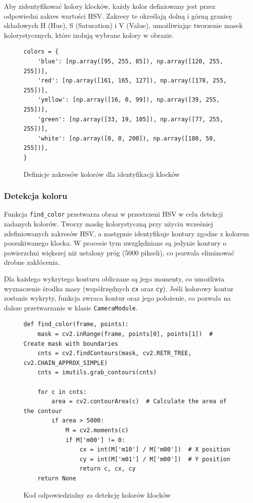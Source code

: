 Aby zidentyfikować kolory klocków, każdy kolor definiowany jest przez odpowiedni zakres wartości HSV. Zakresy te określają dolną i górną granicę składowych H (Hue), S (Saturation) i V (Value), umożliwiając tworzenie masek kolorystycznych, które izolują wybrane kolory w obrazie.

\begin{figure}[H]
  \centering
  \begin{lstlisting}
colors = {
    'blue': [np.array([95, 255, 85]), np.array([120, 255, 255])],
    'red': [np.array([161, 165, 127]), np.array([178, 255, 255])],
    'yellow': [np.array([16, 0, 99]), np.array([39, 255, 255])],
    'green': [np.array([33, 19, 105]), np.array([77, 255, 255])],
    'white': [np.array([0, 0, 200]), np.array([180, 50, 255])],
}
  \end{lstlisting}
  \caption{Definicje zakresów kolorów dla identyfikacji klocków}
  \label{fig:color_definitions}
\end{figure}

\subsubsection{Detekcja koloru}

Funkcja \texttt{find\_color} przetwarza obraz w przestrzeni HSV w celu detekcji zadanych kolorów. Tworzy maskę kolorystyczną przy użyciu wcześniej zdefiniowanych zakresów HSV, a następnie identyfikuje kontury zgodne z kolorem poszukiwanego klocka. W procesie tym uwzględniane są jedynie kontury o powierzchni większej niż ustalony próg (5000 pikseli), co pozwala eliminować drobne zakłócenia.

Dla każdego wykrytego konturu obliczane są jego momenty, co umożliwia wyznaczenie środka masy (współrzędnych \texttt{cx} oraz \texttt{cy}). Jeśli kolorowy kontur zostanie wykryty, funkcja zwraca kontur oraz jego położenie, co pozwala na dalsze przetwarzanie w klasie \texttt{CameraModule}.

\begin{figure}[H]
  \centering
  \begin{lstlisting}
def find_color(frame, points):
    mask = cv2.inRange(frame, points[0], points[1])  # Create mask with boundaries
    cnts = cv2.findContours(mask, cv2.RETR_TREE, cv2.CHAIN_APPROX_SIMPLE)
    cnts = imutils.grab_contours(cnts)

    for c in cnts:
        area = cv2.contourArea(c)  # Calculate the area of the contour
        if area > 5000:
            M = cv2.moments(c)
            if M['m00'] != 0:
                cx = int(M['m10'] / M['m00'])  # X position
                cy = int(M['m01'] / M['m00'])  # Y position
                return c, cx, cy
    return None
  \end{lstlisting}
  \caption{Kod odpowiedzialny za detekcję kolorów klocków}
  \label{fig:color_detection}
\end{figure}

